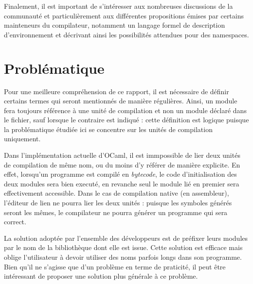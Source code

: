 \documentclass[11pt,a4paper]{report}
\begin{document}
Finalement, il est important de s'intéresser aux nombreuses discussions de la
communauté\cite{ocaml-platform} et particulièrement aux différentes propositions
émises par certains mainteneurs du compilateur\cite{ocaml-proposals}, notamment
un langage formel de description d'environnement\cite{remy-scherer-prop} et
décrivant ainsi les possibilités attendues pour des namespaces.

\chapter{Problématique}

Pour une meilleure compréhension de ce rapport, il est nécessaire de définir
certains termes qui seront mentionnés de manière régulières. Ainsi, un module
fera toujours référence à une unité de compilation et non un module déclaré dans
le fichier, sauf lorsque le contraire est indiqué : cette définition est logique
puisque la problématique étudiée ici se concentre sur les unités de compilation
uniquement. 

Dans l'implémentation actuelle d'OCaml, il est immpossible de lier deux unités
de compilation de même nom, ou du moins d'y référer de manière explicite. En
effet, lorsqu'un programme est compilé en \emph{bytecode}, le code
d'initialisation des deux modules sera bien executé, en revanche seul le module
lié en premier sera effectivement accessible. Dans le cas de compilation native
(en assembleur), l'éditeur de lien ne pourra lier les deux unités : puisque les
symboles générés seront les mêmes, le compilateur ne pourra générer un programme
qui sera correct.

La solution adoptée par l'ensemble des développeurs est de préfixer leurs
modules par le nom de la bibliothèque dont elle est issue. Cette solution est
efficace mais oblige l'utilisateur à devoir utiliser des noms parfois longs dans
son programme. Bien qu'il ne s'agisse que d'un problème en terme de praticité,
il peut être intéressant de proposer une solution plus générale à ce problème.
\end{document}
